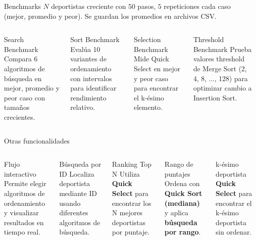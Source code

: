 \begin{frame}{Benchmarks}
    $N$ deportistas creciente con $50$ pasos, $5$ repeticiones cada caso (mejor, promedio y peor). Se guardan los promedios en archivos CSV.
    \begin{columns}[T]
        \begin{block}{Search Benchmark}
            Compara 6 algoritmos de búsqueda en mejor, promedio y peor caso con tamaños crecientes.
        \end{block}

        \begin{block}{Sort Benchmark}
            Evalúa 10 variantes de ordenamiento con intervalos para identificar rendimiento relativo.
        \end{block}

        \begin{block}{Selection Benchmark}
            Mide Quick Select en mejor y peor caso para encontrar el k-ésimo elemento.
        \end{block}

        \begin{block}{Threshold Benchmark}
            Prueba valores threshold de Merge Sort (2, 4, 8, ..., 128) para optimizar cambio a Insertion Sort.
        \end{block}
    \end{columns}

\end{frame}

\begin{frame}[squeeze]{Otras funcionalidades}
    \begin{columns}[T]

        \begin{block}{Flujo interactivo}
            Permite elegir algoritmos de ordenamiento y visualizar resultados en tiempo real.
        \end{block}

        \begin{block}{Búsqueda por ID}
            Localiza deportista mediante ID usando diferentes algoritmos de búsqueda.
        \end{block}

        \begin{block}{Ranking Top N}
            Utiliza \textbf{Quick Select} para encontrar los N mejores deportistas por puntaje.
        \end{block}

        \begin{block}{Rango de puntajes}
            Ordena con \textbf{Quick Sort (mediana)} y aplica \textbf{búsqueda por rango}.
        \end{block}

        \begin{block}{k-ésimo deportista}
            \textbf{Quick Select} para encontrar el k-ésimo deportista sin ordenar.
        \end{block}
    \end{columns}

\end{frame}

